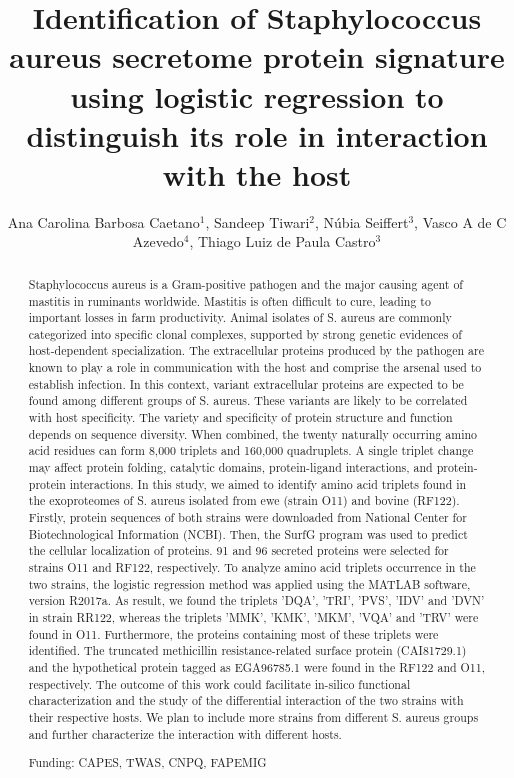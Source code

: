 \documentclass[twoside]{article}
\title{\vspace{-15mm}\fontsize{24pt}{10pt}\selectfont\textbf{Identification of Staphylococcus aureus secretome protein signature using logistic regression to distinguish its role in interaction with the host}} %
\author{Ana Carolina Barbosa Caetano$^1$, Sandeep Tiwari$^2$, N\'ubia Seiffert$^3$, Vasco A de C Azevedo$^4$, Thiago Luiz de Paula Castro$^3$}
\affil{1 UFMG\\ 2 INSTITUTE OF BIOLOGICAL SCIENCE, UFMG, BELO HORIZONTE\\ 3 UFBA\\ }
\date{}
\begin{document}
\maketitle %

\thispagestyle{fancy} %


\begin{abstract}
Staphylococcus aureus is a Gram-positive pathogen and the major causing agent of mastitis in ruminants worldwide. Mastitis is often difficult to cure, leading to important losses in farm productivity. Animal isolates of S. aureus are commonly categorized into specific clonal complexes, supported by strong genetic evidences of host-dependent specialization. The extracellular proteins produced by the pathogen are known to play a role in communication with the host and comprise the arsenal used to establish infection. In this context, variant extracellular proteins are expected to be found among different groups of S. aureus. These variants are likely to be correlated with host specificity. The variety and specificity of protein structure and function depends on sequence diversity. When combined, the twenty naturally occurring amino acid residues can form 8,000 triplets and 160,000 quadruplets. A single triplet change may affect protein folding, catalytic domains, protein-ligand interactions, and protein-protein interactions. In this study, we aimed to identify amino acid triplets found in the exoproteomes of S. aureus isolated from ewe (strain O11) and bovine (RF122). Firstly, protein sequences of both strains were downloaded from National Center for Biotechnological Information (NCBI). Then, the SurfG program was used to predict the cellular localization of proteins. 91 and 96 secreted proteins were selected for strains O11 and RF122, respectively. To analyze amino acid triplets occurrence in the two strains, the logistic regression method was applied using the MATLAB software, version R2017a. As result, we found the triplets 'DQA', 'TRI', 'PVS', 'IDV' and 'DVN' in strain RR122, whereas the triplets 'MMK', 'KMK', 'MKM', 'VQA' and 'TRV' were found in O11. Furthermore, the proteins containing most of these triplets were identified. The truncated methicillin resistance-related surface protein (CAI81729.1) and the hypothetical protein tagged as EGA96785.1 were found in the RF122 and O11, respectively. The outcome of this work could facilitate in-silico functional characterization and the study of the differential interaction of the two strains with their respective hosts. We plan to include more strains from different S. aureus groups and further characterize the interaction with different hosts.

Funding: CAPES, TWAS, CNPQ, FAPEMIG
\end{abstract}
\end{document}
